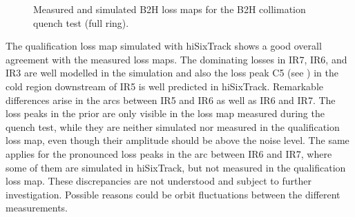 \begin{figure}[htbp]
  \centering
  \caption{Measured and simulated B2H loss maps for the B2H collimation quench test (full ring).}  
  \label{pic:16071401}
  \end{figure}




The qualification loss map simulated with hiSixTrack shows a good overall agreement with the measured loss maps. The dominating losses in IR7, IR6, and IR3 are well modelled in the simulation and also the loss peak C5 (see ) in the cold region downstream of IR5 is well predicted in hiSixTrack. Remarkable differences arise in the arcs between IR5 and IR6 as well as IR6 and IR7. The loss peaks in the prior are only visible in the loss map measured during the quench test, while they are neither simulated nor measured in the qualification loss map, even though their amplitude should be above the noise level. The same applies for the pronounced loss peaks in the arc between IR6 and IR7, where some of them are simulated in hiSixTrack, but not measured in the qualification loss map. These discrepancies are not understood and subject to further investigation. Possible reasons could be orbit fluctuations between the different measurements. 

